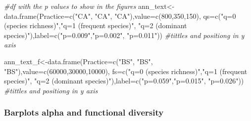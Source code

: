 \documentclass[]{interact}
\theoremstyle{plain}%
\theoremstyle{definition}
\theoremstyle{remark}
\newenvironment{Shaded}{\begin{snugshade}}{\end{snugshade}}
\newcommand{\AttributeTok}[1]{\textcolor[rgb]{0.77,0.63,0.00}{#1}}
\newcommand{\CommentTok}[1]{\textcolor[rgb]{0.56,0.35,0.01}{\textit{#1}}}
\newcommand{\DecValTok}[1]{\textcolor[rgb]{0.00,0.00,0.81}{#1}}
\newcommand{\FunctionTok}[1]{\textcolor[rgb]{0.00,0.00,0.00}{#1}}
\newcommand{\NormalTok}[1]{#1}
\newcommand{\OtherTok}[1]{\textcolor[rgb]{0.56,0.35,0.01}{#1}}
\newcommand{\StringTok}[1]{\textcolor[rgb]{0.31,0.60,0.02}{#1}}
\begin{document}
\begin{Shaded}
\begin{Highlighting}[]
\CommentTok{\#df with the p values to show in the figures}
\NormalTok{ann\_text}\OtherTok{\textless{}{-}}\FunctionTok{data.frame}\NormalTok{(}\AttributeTok{Practice=}\FunctionTok{c}\NormalTok{(}\StringTok{"CA"}\NormalTok{, }\StringTok{"CA"}\NormalTok{, }\StringTok{"CA"}\NormalTok{),}\AttributeTok{value=}\FunctionTok{c}\NormalTok{(}\DecValTok{800}\NormalTok{,}\DecValTok{350}\NormalTok{,}\DecValTok{150}\NormalTok{),}
\AttributeTok{qs=}\FunctionTok{c}\NormalTok{(}\StringTok{"q=0 (species richness)"}\NormalTok{,}\StringTok{"q=1 (frequent species)"}\NormalTok{,}
\StringTok{"q=2 (dominant species)"}\NormalTok{),}\AttributeTok{label=}\FunctionTok{c}\NormalTok{(}\StringTok{"p=0.009"}\NormalTok{,}\StringTok{"p=0.002"}\NormalTok{, }\StringTok{"p=0.011"}\NormalTok{)) }
\CommentTok{\#tittles and positiong in y axis}

\NormalTok{ann\_text\_f}\OtherTok{\textless{}{-}}\FunctionTok{data.frame}\NormalTok{(}\AttributeTok{Practice=}\FunctionTok{c}\NormalTok{(}\StringTok{"BS"}\NormalTok{, }\StringTok{"BS"}\NormalTok{, }\StringTok{"BS"}\NormalTok{),}\AttributeTok{value=}\FunctionTok{c}\NormalTok{(}\DecValTok{60000}\NormalTok{,}\DecValTok{30000}\NormalTok{,}\DecValTok{10000}\NormalTok{),}
\AttributeTok{fs=}\FunctionTok{c}\NormalTok{(}\StringTok{"q=0 (species richness)"}\NormalTok{,}\StringTok{"q=1 (frequent species)"}\NormalTok{,}
\StringTok{"q=2 (dominant species)"}\NormalTok{),}\AttributeTok{label=}\FunctionTok{c}\NormalTok{(}\StringTok{"p=0.059"}\NormalTok{,}\StringTok{"p=0.015"}\NormalTok{, }\StringTok{"p=0.026"}\NormalTok{))}
\CommentTok{\#tittles and positiong in y axis}
\end{Highlighting}
\end{Shaded}

\hypertarget{barplots-alpha-and-functional-diversity-1}{%
\subsubsection{Barplots alpha and functional
diversity}\label{barplots-alpha-and-functional-diversity-1}}
\end{document}
